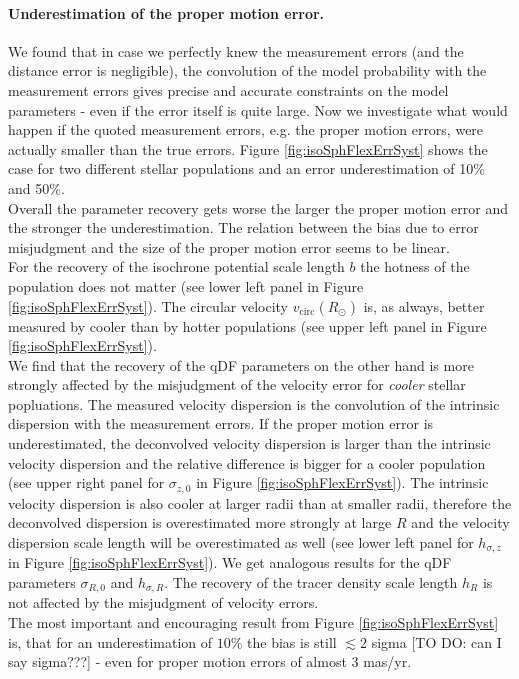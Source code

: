 \paragraph{Underestimation of the proper motion error.} We found that in case we perfectly knew the measurement errors (and the distance error is negligible), the convolution of the model probability with the measurement errors gives precise and accurate constraints on the model parameters - even if the error itself is quite large. Now we investigate what would happen if the quoted measurement errors, e.g. the proper motion errors, were actually smaller than the true errors. Figure \ref{fig:isoSphFlexErrSyst} shows the case for two different stellar populations and an error underestimation of 10\% and 50\%. 
\\Overall the parameter recovery gets worse the larger the proper motion error and the stronger the underestimation. The relation between the bias due to error misjudgment and the size of the proper motion error seems to be linear.
\\For the recovery of the isochrone potential scale length $b$ the hotness of the population does not matter (see lower left panel in Figure \ref{fig:isoSphFlexErrSyst}). The circular velocity $v_\text{circ}(R_\odot)$ is, as always, better measured by cooler than by hotter populations (see upper left panel in Figure \ref{fig:isoSphFlexErrSyst}). 
\\We find that the recovery of the qDF parameters on the other hand is more strongly affected by the misjudgment of the velocity error for \emph{cooler} stellar popluations. The measured velocity dispersion is the convolution of the intrinsic dispersion with the measurement errors. If the proper motion error is underestimated, the deconvolved velocity dispersion is larger than the intrinsic velocity dispersion and the relative difference is bigger for a cooler population (see upper right panel for $\sigma_{z,0}$ in Figure \ref{fig:isoSphFlexErrSyst}). The intrinsic velocity dispersion is also cooler at larger radii than at smaller radii, therefore the deconvolved dispersion is overestimated more strongly at large $R$ and the velocity dispersion scale length will be overestimated as well (see lower left panel for $h_{\sigma,z}$ in Figure \ref{fig:isoSphFlexErrSyst}). We get analogous results for the qDF parameters $\sigma_{R,0}$ and $h_{\sigma,R}$. The recovery of the tracer density scale length $h_R$ is not affected by the misjudgment of velocity errors. 
\\The most important and encouraging result from Figure \ref{fig:isoSphFlexErrSyst} is, that for an underestimation of $10\%$ the bias is still $\lesssim 2$ sigma [TO DO: can I say sigma???] - even for proper motion errors of almost $3$ mas/yr.

